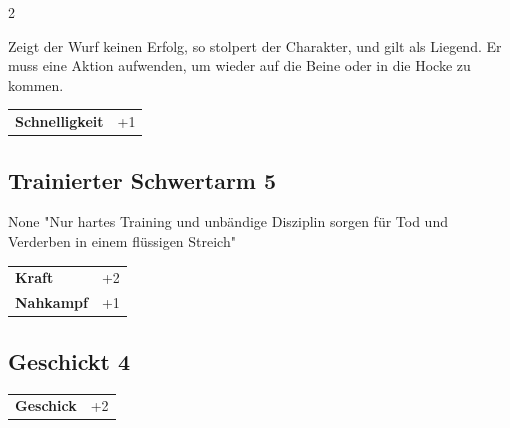 \begin{multicols}{2}
\begin{tcolorbox}
Zeigt der Wurf keinen Erfolg, so stolpert der Charakter, und gilt als Liegend. Er muss eine Aktion aufwenden, um wieder auf die Beine oder in die Hocke zu kommen.


\vspace{3mm}

\begin{tabular}{@{}ll@{}}
    \textbf{Schnelligkeit} & +1\\
\end{tabular}


\end{tcolorbox}

\begin{tcolorbox}
    \subsection*{Trainierter Schwertarm \hfill \small{5 }}
    \tcblower


\begin{pquote}{None}
"Nur hartes Training und unbändige Disziplin sorgen für Tod und Verderben in einem flüssigen Streich"
\end{pquote}

\vspace{3mm}

\begin{tabular}{@{}ll@{}}
    \textbf{Kraft} & +2\\
    \textbf{Nahkampf} & +1\\
\end{tabular}


\end{tcolorbox}

\begin{tcolorbox}
    \subsection*{Geschickt \hfill \small{4 }}
    \tcblower




\begin{tabular}{@{}ll@{}}
    \textbf{Geschick} & +2\\
\end{tabular}


\end{tcolorbox}
\end{multicols}
